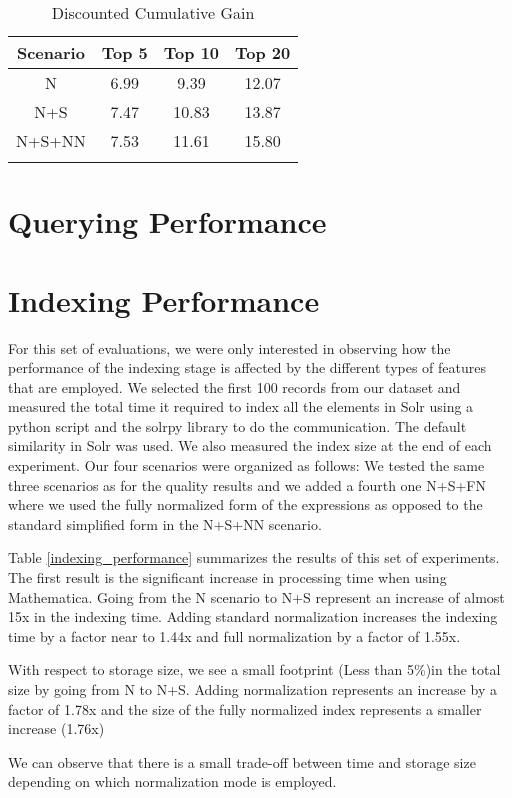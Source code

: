 \begin{longtable}{|c|c|c|c|}
\hline 
\textbf{Scenario} & \textbf{Top 5} & \textbf{Top 10} & \textbf{Top 20} \\ 
\hline 
N & 6.99 & 9.39 & 12.07 \\ 
\hline 
N+S & 7.47 & 10.83 & 13.87 \\ 
\hline 
N+S+NN & 7.53 & 11.61 & 15.80 \\ 
\hline 
\caption{Discounted Cumulative Gain}
\label{loose_precision}
\end{longtable} 

\section{Querying Performance}

\section{Indexing Performance}
For this set of evaluations, we were only interested in observing how the performance of the indexing stage is affected by the different types of features that are employed. We selected the first 100 records from our dataset and measured the total time it required to index all the elements in Solr using a python script and the solrpy library to do the communication. The default similarity in Solr was used. We also measured the index size at the end of each experiment.
Our four scenarios were organized as follows:
We tested the same three scenarios as for the quality results and we added a fourth one N+S+FN where we used the fully normalized form of the expressions as opposed to the standard simplified form in the N+S+NN scenario.

Table \ref{indexing_performance} summarizes the results of this set of experiments. The first result is the significant increase in processing time when using Mathematica. Going from the N scenario to N+S represent an increase of almost 15x in the indexing time. Adding standard normalization increases the indexing time by a factor near to 1.44x and full normalization by a factor of 1.55x.

With respect to storage size, we see a small footprint (Less than 5\%)in the total size by going from N to N+S. Adding normalization represents an increase by a factor of 1.78x and the size of the fully normalized index represents a smaller increase (1.76x)

We can observe that there is a small trade-off between time and storage size depending on which normalization mode is employed.

